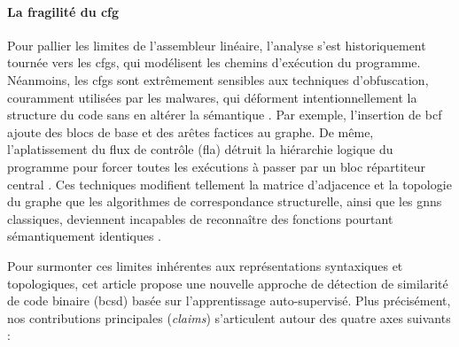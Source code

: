\paragraph{La fragilité du \gls{cfg}} 
Pour pallier les limites de l'assembleur linéaire, l'analyse s'est historiquement tournée vers les \glspl{cfg}, qui modélisent les chemins d'exécution du programme.
Néanmoins, les \glspl{cfg} sont extrêmement sensibles aux techniques d'obfuscation, couramment utilisées par les malwares, qui déforment intentionnellement la structure du code sans en altérer la sémantique \cite{orcas_2025}.
Par exemple, l'insertion de \gls{bcf} ajoute des blocs de base et des arêtes factices au graphe.
De même, l'aplatissement du flux de contrôle (\gls{fla}) détruit la hiérarchie logique du programme pour forcer toutes les exécutions à passer par un bloc répartiteur central \cite{orcas_2025}.
Ces techniques modifient tellement la matrice d'adjacence et la topologie du graphe que les algorithmes de correspondance structurelle, ainsi que les \glspl{gnn} classiques, deviennent incapables de reconnaître des fonctions pourtant sémantiquement identiques \cite{orcas_2025}.

Pour surmonter ces limites inhérentes aux représentations syntaxiques et topologiques, cet article propose une nouvelle approche de détection de similarité de code binaire (\gls{bcsd}) basée sur l'apprentissage auto-supervisé.
Plus précisément, nos contributions principales (\textit{claims}) s'articulent autour des quatre axes suivants :

